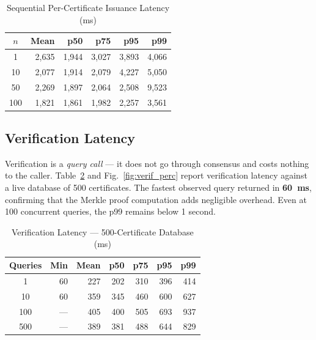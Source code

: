 \documentclass[journal]{IEEEtran}
\begin{document}
\begin{table}[t]
\caption{Sequential Per-Certificate Issuance Latency (ms)}
\label{tab:seq_issuance}
\centering\small\renewcommand{\arraystretch}{1.1}
\begin{tabular}{@{}crrrrr@{}}
\toprule
\textbf{$n$} & \textbf{Mean} & \textbf{p50} & \textbf{p75} & \textbf{p95} & \textbf{p99} \\
\midrule
1   & 2{,}635 & 1{,}944 & 3{,}027 & 3{,}893 & 4{,}066 \\
10  & 2{,}077 & 1{,}914 & 2{,}079 & 4{,}227 & 5{,}050 \\
50  & 2{,}269 & 1{,}897 & 2{,}064 & 2{,}508 & 9{,}523 \\
100 & 1{,}821 & 1{,}861 & 1{,}982 & 2{,}257 & 3{,}561 \\
\bottomrule
\end{tabular}
\end{table}

\subsection{Verification Latency}

Verification is a \emph{query call} — it does not go through consensus and costs nothing to the caller. Table~\ref{tab:verif} and Fig.~\ref{fig:verif_perc} report verification latency against a live database of 500 certificates. The fastest observed query returned in \textbf{60~ms}, confirming that the Merkle proof computation adds negligible overhead. Even at 100 concurrent queries, the p99 remains below 1 second.

\begin{table}[t]
\caption{Verification Latency --- 500-Certificate Database (ms)}
\label{tab:verif}
\centering\small\renewcommand{\arraystretch}{1.1}
\begin{tabular}{@{}crrrrrr@{}}
\toprule
\textbf{Queries} & \textbf{Min} & \textbf{Mean} & \textbf{p50} & \textbf{p75} & \textbf{p95} & \textbf{p99} \\
\midrule
1   & 60  & 227 & 202 & 310 & 396 & 414 \\
10  & 60  & 359 & 345 & 460 & 600 & 627 \\
100 & --- & 405 & 400 & 505 & 693 & 937 \\
500 & --- & 389 & 381 & 488 & 644 & 829 \\
\bottomrule
\end{tabular}
\end{table}
\end{document}
